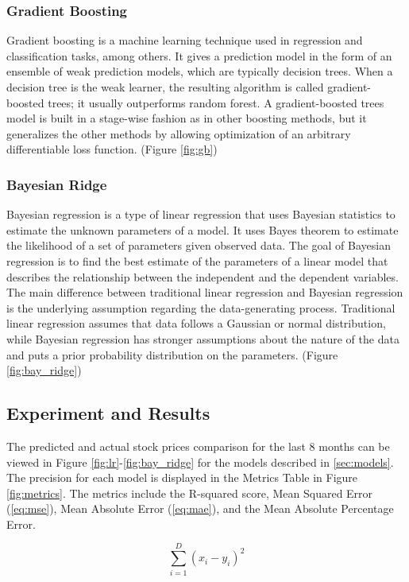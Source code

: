 \documentclass[conference]{IEEEtran}
\begin{document}
\subsubsection{Gradient Boosting}
Gradient boosting is a machine learning technique used in regression and classification tasks, among others.
It gives a prediction model in the form of an ensemble of weak prediction models, which are typically decision trees.
When a decision tree is the weak learner, the resulting algorithm is called gradient-boosted trees; it usually outperforms random forest.
A gradient-boosted trees model is built in a stage-wise fashion as in other boosting methods, but it generalizes the other methods by allowing optimization of an arbitrary differentiable loss function.
(Figure \ref{fig:gb})

\subsubsection{Bayesian Ridge}
Bayesian regression is a type of linear regression that uses Bayesian statistics to estimate the unknown parameters of a model.
It uses Bayes theorem to estimate the likelihood of a set of parameters given observed data.
The goal of Bayesian regression is to find the best estimate of the parameters of a linear model that describes the relationship between the independent and the dependent variables.
The main difference between traditional linear regression and Bayesian regression is the underlying assumption regarding the data-generating process.
Traditional linear regression assumes that data follows a Gaussian or normal distribution, while Bayesian regression has stronger assumptions about the nature of the data and puts a prior probability distribution on the parameters.
(Figure \ref{fig:bay_ridge})

\subsection{Experiment and Results}

The predicted and actual stock prices comparison for the last 8 months can be viewed in Figure \ref{fig:lr}-\ref{fig:bay_ridge} for the models described in \ref{sec:models}.
The precision for each model is displayed in the Metrics Table in Figure \ref{fig:metrics}.
The metrics include the R-squared score, Mean Squared Error (\ref{eq:mse}), Mean Absolute Error (\ref{eq:mae}), and the Mean Absolute Percentage Error.

\begin{equation}
    \sum_{i=1}^{D}(x_i-y_i)^2
    \label{eq:mse}
\end{equation}
\end{document}

